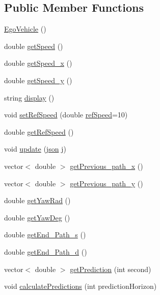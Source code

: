 \subsection*{Public Member Functions}
\begin{DoxyCompactItemize}
\item 
\hyperlink{classEgoVehicle_a2fdc6347881fa4a7a629642f0bbacd82}{Ego\+Vehicle} ()
\item 
double \hyperlink{classEgoVehicle_a8062f2bbb14f1bd787921cd83d4e5475}{get\+Speed} ()
\item 
double \hyperlink{classEgoVehicle_a692add014c4846c554c4d08e170c140a}{get\+Speed\+\_\+x} ()
\item 
double \hyperlink{classEgoVehicle_a88d4bc1d06c685f060d8e628452173fb}{get\+Speed\+\_\+y} ()
\item 
string \hyperlink{classEgoVehicle_a68e3c46400e34d4f805fcc392ecd5563}{display} ()
\item 
void \hyperlink{classEgoVehicle_a5ba202f45ceff0e164f55a7e1535a178}{set\+Ref\+Speed} (double \hyperlink{classEgoVehicle_a80a9ae1a27a7368cd10f22ac08edcbd3}{ref\+Speed}=10)
\item 
double \hyperlink{classEgoVehicle_a487b97b4bb6f969dc032e1387fc3f26f}{get\+Ref\+Speed} ()
\item 
void \hyperlink{classEgoVehicle_ae189735224d6a6bb46f6170321c128dc}{update} (\hyperlink{main_8cpp_ab701e3ac61a85b337ec5c1abaad6742d}{json} j)
\item 
vector$<$ double $>$ \hyperlink{classEgoVehicle_a6ee0af573a8c20a127f954c5237121c5}{get\+Previous\+\_\+path\+\_\+x} ()
\item 
vector$<$ double $>$ \hyperlink{classEgoVehicle_ad87d6b79a64ddae062f3a70575263091}{get\+Previous\+\_\+path\+\_\+y} ()
\item 
double \hyperlink{classEgoVehicle_a2f819cd37b15262c2751aaec5f78e4df}{get\+Yaw\+Rad} ()
\item 
double \hyperlink{classEgoVehicle_aa75a2d9f4457d5bf249acc0e4672d327}{get\+Yaw\+Deg} ()
\item 
double \hyperlink{classEgoVehicle_a4bc481d854046754ad80e5106e82c685}{get\+End\+\_\+\+Path\+\_\+s} ()
\item 
double \hyperlink{classEgoVehicle_ae6341fe7bd256601b267cd1a3f122ac0}{get\+End\+\_\+\+Path\+\_\+d} ()
\item 
vector$<$ double $>$ \hyperlink{classEgoVehicle_af44e6b8bb8af7410ea404b8939507c93}{get\+Prediction} (int second)
\item 
void \hyperlink{classEgoVehicle_ae0b5afee444e02d3211d1bc0c6524bbe}{calculate\+Predictions} (int prediction\+Horizon)
\end{DoxyCompactItemize}
